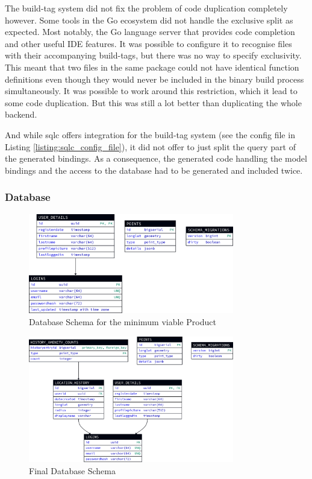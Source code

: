 The build-tag system did not fix the problem of code duplication completely
however. Some tools in the Go ecosystem did not handle the exclusive split as
expected. Most notably, the Go language server that provides code completion and
other useful IDE features. It was possible to configure it to recognise files
with their accompanying build-tags, but there was no way to specify exclusivity.
This meant that two files in the same package could not have identical function
definitions even though they would never be included in the binary build process
simultaneously. It was possible to work around this restriction, which it lead
to some code duplication. But this was still a lot better than duplicating the
whole backend.

And while sqlc offers integration for the build-tag system (see the config file
in Listing \ref{listing:sqlc_config_file}), it did not offer to just split the
query part of the generated bindings. As a consequence, the generated code
handling the model bindings and the access to the database had to be generated
and included twice.

\subsubsection{Database}

\begin{figure}[htbp]
  \centering{}
  \includegraphics[width=0.8\textwidth]{../d2-diagrams/database-init/database-init.png}
  \caption{Database Schema for the minimum viable Product}
  \label{fig:database_init_schema}
\end{figure}

\begin{figure}[htbp]
  \centering{}
  \includegraphics[width=0.8\textwidth]{../d2-diagrams/database-final/database-final.png}
  \caption{Final Database Schema}
  \label{fig:database_final_schema}
\end{figure}

